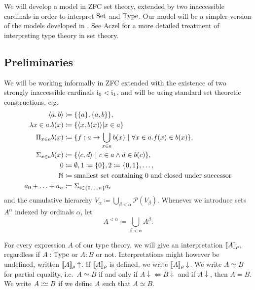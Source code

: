 \documentclass{article}
\begin{document}
We will develop a model in ZFC set theory, extended by two
inaccessible cardinals in order to interpret $\text{Set}$ and $\text{Type}$.  Our
model will be a simpler version of the models developed in
\cite{dybjersetzer1999finax,dybjersetzer2006IIR}. %
See Aczel \cite{aczel1999typesandsets} for a more detailed treatment
of interpreting type theory in set theory.



\subsection{Preliminaries}

We will be working informally in ZFC extended with the existence of two
strongly inaccessible cardinals $\mathfrak{i}_0 < \mathfrak{i}_1$,
and will be using standard set theoretic constructions, e.g.
\begin{align*}
\langle a, b\rangle &\coloneqq \{ \{ a \}, \{ a, b \}\}, \\
\lambda x \in a.b(x) &\coloneqq \{\langle x, b(x)\rangle | x \in a \} \\
\Pi_{x \in a}b(x) &\coloneqq \{ f : a \to \bigcup_{x \in a}b(x)\ |\ \forall x \in a.f(x) \in b(x)\}, \\
\Sigma_{x \in a}b(x) &\coloneqq \{ \langle c , d\rangle\ |\ c \in a \land d
\in b(c) \}, \\
0 &\coloneqq \emptyset, 1 \coloneqq \{0\}, 2 \coloneqq \{0, 1\}, \ldots, \\
\Nat &\coloneqq \text{smallest set containing $0$ and closed under successor} \\
a_0 + \ldots + a_n &\coloneqq \Sigma_{i \in \{0, \ldots, n\}}a_i
\end{align*}
and the cumulative hierarchy $V_{\alpha} \coloneqq
\displaystyle\bigcup_{\beta < \alpha} \mathcal{P}(V_{\beta})$. Whenever we
introduce sets $A^{\alpha}$ indexed by ordinals $\alpha$, let \[A^{< \alpha}
\coloneqq \displaystyle\bigcup_{\beta < \alpha}A^{\beta}.\]

For every expression $A$ of our type theory, we will give an interpretation
$\llbracket A \rrbracket_\rho$, regardless if $A : \text{Type}$ or $A : B$ or not. Interpretations
might however be undefined, written $\llbracket A \rrbracket_\rho\uparrow$. If $\llbracket A \rrbracket_\rho$
is defined, we write $\llbracket A \rrbracket_\rho\downarrow$. We write $A \simeq B$ for
partial equality, i.e.\ $A \simeq B$ if and only if $A\downarrow
\Leftrightarrow B\downarrow$ and if $A\downarrow$, then $A = B$. We write $A
\mathrel{\mathop:}\simeq B$ if we define $A$ such that $A \simeq B$.
\end{document}
